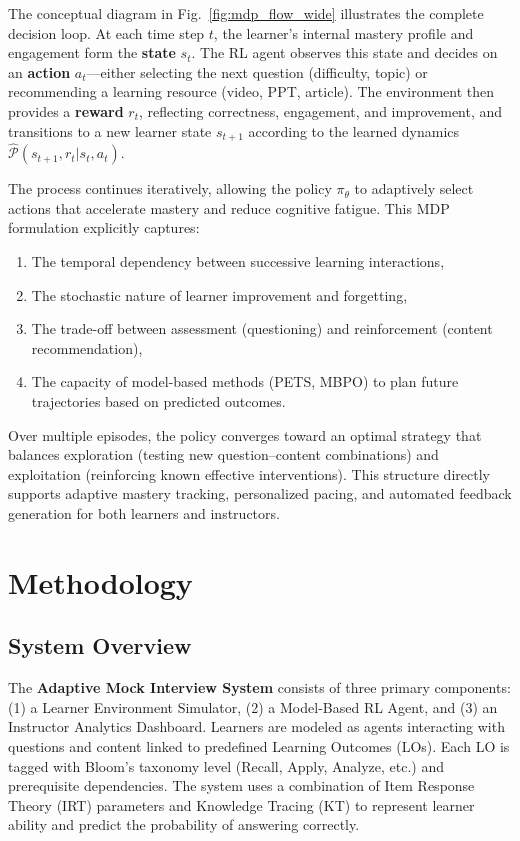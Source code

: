 \documentclass[preprint,12pt]{elsarticle}
\begin{document}
\begin{frontmatter}
The conceptual diagram in Fig.~\ref{fig:mdp_flow_wide} illustrates the complete decision loop.  
At each time step $t$, the learner’s internal mastery profile and engagement form the \textbf{state} $s_t$.  
The RL agent observes this state and decides on an \textbf{action} $a_t$—either selecting the next question (difficulty, topic) or recommending a learning resource (video, PPT, article).  
The environment then provides a \textbf{reward} $r_t$, reflecting correctness, engagement, and improvement, and transitions to a new learner state $s_{t+1}$ according to the learned dynamics $\hat{\mathcal{P}}(s_{t+1},r_t|s_t,a_t)$.  

The process continues iteratively, allowing the policy $\pi_\theta$ to adaptively select actions that accelerate mastery and reduce cognitive fatigue.  
This MDP formulation explicitly captures:
\begin{enumerate}
    \item The temporal dependency between successive learning interactions,
    \item The stochastic nature of learner improvement and forgetting,
    \item The trade-off between assessment (questioning) and reinforcement (content recommendation),
    \item The capacity of model-based methods (PETS, MBPO) to plan future trajectories based on predicted outcomes.
\end{enumerate}

Over multiple episodes, the policy converges toward an optimal strategy that balances exploration (testing new question–content combinations) and exploitation (reinforcing known effective interventions).  
This structure directly supports adaptive mastery tracking, personalized pacing, and automated feedback generation for both learners and instructors.

\section{Methodology}

\subsection{System Overview}
The \textbf{Adaptive Mock Interview System} consists of three primary components: 
(1) a Learner Environment Simulator, 
(2) a Model-Based RL Agent, and 
(3) an Instructor Analytics Dashboard. 
Learners are modeled as agents interacting with questions and content linked to predefined Learning Outcomes (LOs). Each LO is tagged with Bloom’s taxonomy level (Recall, Apply, Analyze, etc.) and prerequisite dependencies. The system uses a combination of Item Response Theory (IRT) parameters and Knowledge Tracing (KT) to represent learner ability and predict the probability of answering correctly.


\end{frontmatter}
\end{document}
